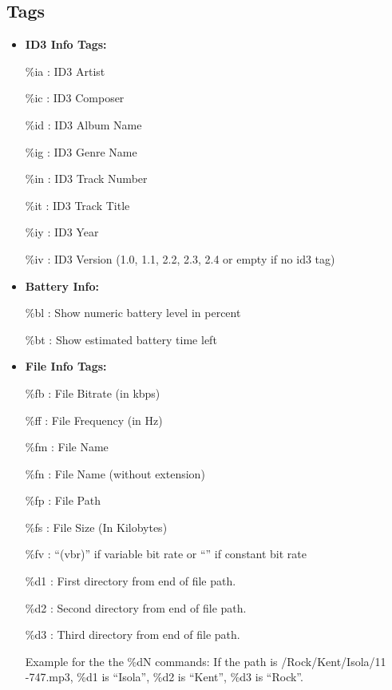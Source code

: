 \subsection{Tags}

\begin{itemize}
\item {\bfseries
ID3 Info Tags:}

\%ia : ID3 Artist

\%ic : ID3 Composer

\%id : ID3 Album Name

\%ig : ID3 Genre Name

\%in : ID3 Track Number

\%it : ID3 Track Title

\%iy : ID3 Year

\%iv : ID3 Version (1.0, 1.1, 2.2, 2.3, 2.4 or empty if no id3 tag)
\item {\bfseries
Battery Info:}

\%bl : Show numeric battery level in percent

\%bt : Show estimated battery time left
\item {\bfseries
File Info Tags:}

\%fb : File Bitrate (in kbps)

\%ff : File Frequency (in Hz)

\%fm : File Name

\%fn : File Name (without extension)

\%fp : File Path

\%fs : File Size (In Kilobytes)

\%fv : ``(vbr)'' if variable bit rate or ``'' if constant bit rate

\%d1 : First directory from end of file path.

\%d2 : Second directory from end of file path.

\%d3 : Third directory from end of file path.

Example for the the \%dN commands: If the path is /Rock/Kent/Isola/11
{}-747.mp3, \%d1 is ``Isola'', \%d2 is ``Kent'', \%d3 is ``Rock''.
\end{itemize}

